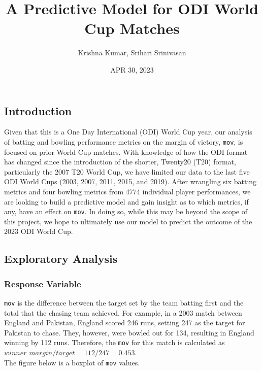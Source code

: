 \documentclass[
]{article}
\title{A Predictive Model for ODI World Cup Matches}
\author{Krishna Kumar, Srihari Srinivasan}
\date{APR 30, 2023}
\begin{document}
\maketitle

\hypertarget{introduction}{%
\subsection{Introduction}\label{introduction}}

Given that this is a One Day International (ODI) World Cup year, our
analysis of batting and bowling performance metrics on the margin of
victory, \texttt{mov}, is focused on prior World Cup matches. With
knowledge of how the ODI format has changed since the introduction of
the shorter, Twenty20 (T20) format, particularly the 2007 T20 World Cup,
we have limited our data to the last five ODI World Cups (2003, 2007,
2011, 2015, and 2019). After wrangling six batting metrics and four
bowling metrics from 4774 individual player performances, we are looking
to build a predictive model and gain insight as to which metrics, if
any, have an effect on \texttt{mov}. In doing so, while this may be
beyond the scope of this project, we hope to ultimately use our model to
predict the outcome of the 2023 ODI World Cup.

\hypertarget{exploratory-analysis}{%
\subsection{Exploratory Analysis}\label{exploratory-analysis}}

\hypertarget{response-variable}{%
\subsubsection{Response Variable}\label{response-variable}}

\texttt{mov} is the difference between the target set by the team
batting first and the total that the chasing team achieved. For example,
in a 2003 match between England and Pakistan, England scored 246 runs,
setting 247 as the target for Pakistan to chase. They, however, were
bowled out for 134, resulting in England winning by 112 runs. Therefore,
the \texttt{mov} for this match is calculated as
\(winner\_margin / target = 112 / 247 = 0.453\).\\

The figure below is a boxplot of \texttt{mov} values.\\
\end{document}
